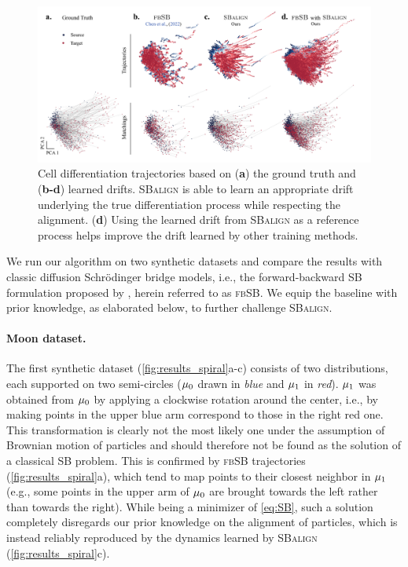 \begin{figure}
    \centering
    \includegraphics[width=\textwidth]{figures/fig_cell_trajectories_matchings.pdf}
    \caption{Cell differentiation trajectories based on (\textbf{a}) the ground truth and (\textbf{b-d}) learned drifts. \textsc{SBalign} is able to learn an appropriate drift underlying the true differentiation process while respecting the alignment. (\textbf{d}) Using the learned drift from \textsc{SBalign} as a reference process helps improve the drift learned by other training methods.}
    \label{fig:results_cell_traj}
\end{figure}

We run our algorithm on two synthetic datasets and compare the results with classic diffusion Schr{\"o}dinger bridge models, i.e., the forward-backward SB formulation proposed by \cite{chen2021likelihood}, herein referred to as \textsc{fbSB}. We equip the baseline with prior knowledge, as elaborated below, to further challenge \textsc{SBalign}.

\paragraph{Moon dataset.}
The first synthetic dataset (\cref{fig:results_spiral}a-c) consists of two distributions, each supported on two semi-circles ($\mu_0$ drawn in \textit{blue} and $\mu_1$ in \textit{red}).
$\mu_1$ was obtained from $\mu_0$ by applying a clockwise rotation around the center, i.e., by making points in the upper blue arm correspond to those in the right red one.
This transformation is clearly not the most likely one under the assumption of Brownian motion of particles and should therefore not be found as the solution of a classical SB problem. 
This is confirmed by \textsc{fbSB} trajectories (\cref{fig:results_spiral}a), which tend to map points to their closest neighbor in $\mu_1$ (e.g., some points in the upper arm of $\mu_0$ are brought towards the left rather than towards the right). 
While being a minimizer of \eqref{eq:SB}, such a solution completely disregards our prior knowledge on the alignment of particles, which is instead reliably reproduced by the dynamics learned by \textsc{SBalign} (\cref{fig:results_spiral}c).

